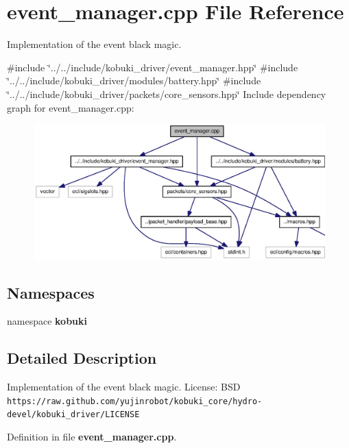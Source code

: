 \section{event\-\_\-manager.\-cpp \-File \-Reference}
\label{event__manager_8cpp}


\-Implementation of the event black magic.  


{\ttfamily \#include \char`\"{}../../include/kobuki\-\_\-driver/event\-\_\-manager.\-hpp\char`\"{}}\*
{\ttfamily \#include \char`\"{}../../include/kobuki\-\_\-driver/modules/battery.\-hpp\char`\"{}}\*
{\ttfamily \#include \char`\"{}../../include/kobuki\-\_\-driver/packets/core\-\_\-sensors.\-hpp\char`\"{}}\*
\-Include dependency graph for event\-\_\-manager.\-cpp\-:
\nopagebreak
\begin{figure}[H]
\begin{center}
\leavevmode
\includegraphics[width=350pt]{event__manager_8cpp__incl}
\end{center}
\end{figure}
\subsection*{\-Namespaces}
\begin{DoxyCompactItemize}
\item 
namespace {\bf kobuki}
\end{DoxyCompactItemize}


\subsection{\-Detailed \-Description}
\-Implementation of the event black magic. \-License\-: \-B\-S\-D {\tt https\-://raw.\-github.\-com/yujinrobot/kobuki\-\_\-core/hydro-\/devel/kobuki\-\_\-driver/\-L\-I\-C\-E\-N\-S\-E} 

\-Definition in file {\bf event\-\_\-manager.\-cpp}.

